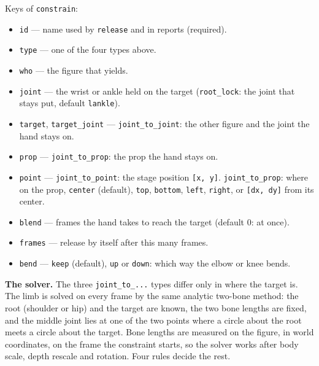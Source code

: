 \documentclass[
  12pt,
  letterpaper,
]{book}
\providecommand{\tightlist}{%
  \setlength{\itemsep}{0pt}\setlength{\parskip}{0pt}}
\begin{document}
Keys of \texttt{constrain}:

\begin{itemize}
\tightlist
\item
  \texttt{id} --- name used by \texttt{release} and in reports
  (required).
\item
  \texttt{type} --- one of the four types above.
\item
  \texttt{who} --- the figure that yields.
\item
  \texttt{joint} --- the wrist or ankle held on the target
  (\texttt{root\_lock}: the joint that stays put, default
  \texttt{lankle}).
\item
  \texttt{target}, \texttt{target\_joint} --- \texttt{joint\_to\_joint}:
  the other figure and the joint the hand stays on.
\item
  \texttt{prop} --- \texttt{joint\_to\_prop}: the prop the hand stays
  on.
\item
  \texttt{point} --- \texttt{joint\_to\_point}: the stage position
  \texttt{{[}x, y{]}}. \texttt{joint\_to\_prop}: where on the prop,
  \texttt{center} (default), \texttt{top}, \texttt{bottom},
  \texttt{left}, \texttt{right}, or \texttt{{[}dx, dy{]}} from its
  center.
\item
  \texttt{blend} --- frames the hand takes to reach the target
  (default 0: at once).
\item
  \texttt{frames} --- release by itself after this many frames.
\item
  \texttt{bend} --- \texttt{keep} (default), \texttt{up} or
  \texttt{down}: which way the elbow or knee bends.
\end{itemize}

\textbf{The solver.} The three
\texttt{joint\_to\_...} types differ only in where the target is. The
limb is solved on every frame by the same analytic two-bone method: the
root (shoulder or hip) and the target are known, the two bone lengths
are fixed, and the middle joint lies at one of the two points where a
circle about the root meets a circle about the target. Bone lengths are
measured on the figure, in world coordinates, on the frame the
constraint starts, so the solver works after body scale, depth rescale
and rotation. Four rules decide the rest.
\end{document}
